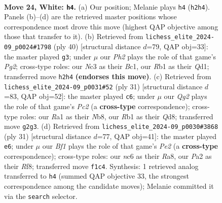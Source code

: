 \documentclass[11pt]{article}
\begin{document}
\clearpage

\begin{figure}[p]\centering
\begin{subfigure}{0.46\textwidth}\centering
\resizebox{\linewidth}{!}{%
\newchessgame
\chessboard[
  setfen={r6r/2qb1kbp/p1npp1p1/1p2p1Pn/4P3/2N2P2/PPPK1BQP/RR3B2 w - - 0 24},
  showmover=false,
  pgfstyle=straightmove, color=movearrow, markmove={h2-h4}
]}
\caption{}
\end{subfigure}\hfill
\begin{subfigure}{0.46\textwidth}\centering
\resizebox{\linewidth}{!}{%
\newchessgame
\chessboard[
  setfen={r1n2rnk/2pq1pb1/3p2pp/pPpPp3/P3P2P/1R3N2/5PP1/2BQRBK1 w - - 2 21},
  showmover=false,
  pgfstyle=straightmove, color=movearrow, markmove={g2-g3}
]}
\caption{}
\end{subfigure}
\\[4pt]
\begin{subfigure}{0.46\textwidth}\centering
\resizebox{\linewidth}{!}{%
\newchessgame
\chessboard[
  setfen={bn1qrbk1/2p2pp1/3p1n1p/1p1Pp3/4P3/1BP4P/1P1N1PPN/2BQR1K1 b - - 1 16},
  showmover=false,
  pgfstyle=straightmove, color=movearrow, markmove={c7-c6}
]}
\caption{}
\end{subfigure}\hfill
\begin{subfigure}{0.46\textwidth}\centering
\resizebox{\linewidth}{!}{%
\newchessgame
\chessboard[
  setfen={r4r1k/pp1qpbbp/2n5/2ppPp2/5P2/3P1N1P/PPP3BK/R1BQ1R2 b - - 6 16},
  showmover=false,
  pgfstyle=straightmove, color=movearrow, markmove={e7-e6}
]}
\caption{}
\end{subfigure}
\caption{\textbf{Move 24, White: \texttt{h4}.} (a) Our position; Melanie plays \texttt{h4} (\texttt{h2h4}). Panels (b)--(d) are the retrieved master positions whose correspondence most drove this move (highest QAP objective among those that transfer to it). (b) Retrieved from \texttt{lichess\_elite\_2024-09\_p0024\#1798} (ply 40) [structural distance $d$=79, QAP obj=33]: the master played \texttt{g3}; under $\mu$ our \emph{Ph2} plays the role of that game's \emph{Pg2}; cross-type roles: our \emph{N}c3 as their \emph{B}c1, our \emph{R}b1 as their \emph{Q}d1; transferred move \texttt{h2h4} \textbf{(endorses this move)}. (c) Retrieved from \texttt{lichess\_elite\_2024-09\_p0031\#52} (ply 31) [structural distance $d$=83, QAP obj=52]: the master played \texttt{c6}; under $\mu$ our \emph{Qg2} plays the role of that game's \emph{Pc2} (a \textbf{cross-type} correspondence); cross-type roles: our \emph{R}a1 as their \emph{N}b8, our \emph{R}b1 as their \emph{Q}d8; transferred move \texttt{g2g3}. (d) Retrieved from \texttt{lichess\_elite\_2024-09\_p0030\#3868} (ply 31) [structural distance $d$=77, QAP obj=41]: the master played \texttt{e6}; under $\mu$ our \emph{Bf1} plays the role of that game's \emph{Pe2} (a \textbf{cross-type} correspondence); cross-type roles: our \emph{n}c6 as their \emph{R}a8, our \emph{P}a2 as their \emph{R}f8; transferred move \texttt{f1c4}. Synthesis: 1 retrieved analog transferred to \texttt{h4} (summed QAP objective 33, the strongest correspondence among the candidate moves); Melanie committed it via the \texttt{search} selector.}
\label{fig:thought-m46}
\end{figure}
\end{document}
